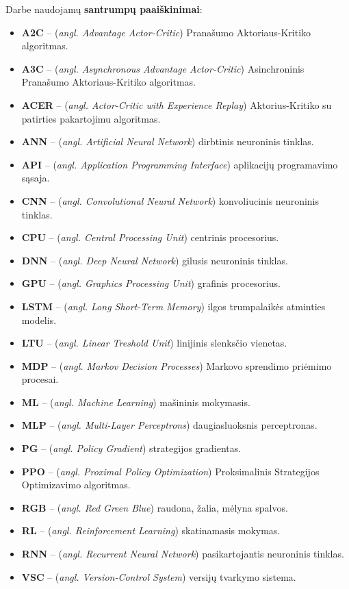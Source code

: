 \documentclass{VUMIFPSbakalaurinis}
\begin{document}
{
	Darbe naudojamų \textbf{santrumpų paaiškinimai}:
	\begin{itemize}
		\item \textbf{A2C} -- (\textit{angl. Advantage Actor-Critic}) Pranašumo Aktoriaus-Kritiko algoritmas.
		\item \textbf{A3C} -- (\textit{angl. Asynchronous Advantage Actor-Critic}) Asinchroninis Pranašumo Aktoriaus-Kritiko algoritmas.
		\item \textbf{ACER} -- (\textit{angl. Actor-Critic with Experience Replay}) Aktorius-Kritiko su patirties pakartojimu algoritmas.
		\item \textbf{ANN} -- (\textit{angl. Artificial Neural Network}) dirbtinis neuroninis tinklas.
		\item \textbf{API} -- (\textit{angl. Application Programming Interface}) aplikacijų programavimo sąsaja.
		\item \textbf{CNN} -- (\textit{angl. Convolutional Neural Network}) konvoliucinis neuroninis tinklas.
		\item \textbf{CPU} -- (\textit{angl. Central Processing Unit}) centrinis procesorius.
		\item \textbf{DNN} -- (\textit{angl. Deep Neural Network}) gilusis neuroninis tinklas.
		\item \textbf{GPU} -- (\textit{angl. Graphics Processing Unit}) grafinis procesorius.
		\item \textbf{LSTM} -- (\textit{angl. Long Short-Term Memory}) ilgos trumpalaikės atminties modelis.
		\item \textbf{LTU} -- (\textit{angl. Linear Treshold Unit}) linijinis slenksčio vienetas.
		\item \textbf{MDP} -- (\textit{angl. Markov Decision Processes}) Markovo sprendimo priėmimo procesai.
		\item \textbf{ML} -- (\textit{angl. Machine Learning}) mašininis mokymasis.
		\item \textbf{MLP} -- (\textit{angl. Multi-Layer Perceptrons}) daugiasluoksnis perceptronas.
		\item \textbf{PG} -- (\textit{angl. Policy Gradient}) strategijos gradientas.
		\item \textbf{PPO} -- (\textit{angl. Proximal Policy Optimization}) Proksimalinis Strategijos Optimizavimo algoritmas.
		\item \textbf{RGB} -- (\textit{angl. Red Green Blue}) raudona, žalia, mėlyna spalvos.
		\item \textbf{RL} -- (\textit{angl. Reinforcement Learning}) skatinamasis mokymas.
		\item \textbf{RNN} -- (\textit{angl. Recurrent Neural Network}) pasikartojantis neuroninis tinklas.
		\item \textbf{VSC} -- (\textit{angl. Version-Control System}) versijų tvarkymo sistema.
	\end{itemize}
}
\end{document}
